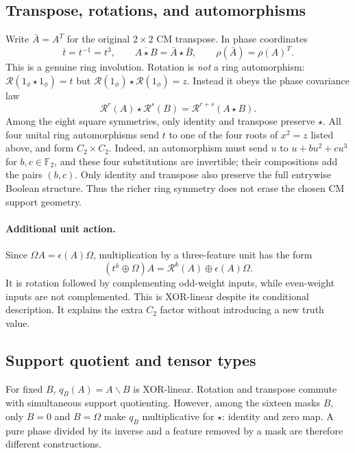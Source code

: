 \documentclass[11pt,a4paper]{article}
\theoremstyle{definition}\newtheorem{definition}[theorem]{Definition}
\theoremstyle{remark}\newtheorem{remark}[theorem]{Remark}
\newcommand{\F}{\mathbb F}
\newcommand{\rot}{\mathcal R}
\newcommand{\one}{1_{\phi}}
\numberwithin{equation}{section}
\begin{document}
\subsection{Transpose, rotations, and automorphisms}
Write $\bar A=A^T$ for the original $2\times2$ CM transpose. In phase coordinates
\begin{equation}
 \overline{t}=t^{-1}=t^3,\qquad
 \overline{A\star B}=\bar A\star\bar B,\qquad
 \rho(\bar A)=\rho(A)^T.
\end{equation}
This is a genuine ring involution. Rotation is \emph{not} a ring automorphism: $\rot(\one\star\one)=t$ but $\rot(\one)\star\rot(\one)=z$. Instead it obeys the phase covariance law
\begin{equation}
 \rot^r(A)\star\rot^s(B)=\rot^{r+s}(A\star B).
\end{equation}
Among the eight square symmetries, only identity and transpose preserve $\star$. All four unital ring automorphisms send $t$ to one of the four roots of $x^2=z$ listed above, and form $C_2\times C_2$. Indeed, an automorphism must send $u$ to $u+b u^2+c u^3$ for $b,c\in\F_2$, and these four substitutions are invertible; their compositions add the pairs $(b,c)$. Only identity and transpose also preserve the full entrywise Boolean structure. Thus the richer ring symmetry does not erase the chosen CM support geometry.

\paragraph{Additional unit action.}
Since $\Omega A=\epsilon(A)\Omega$, multiplication by a three-feature unit has the form
\begin{equation}\label{eq:unitaction}
 (t^k\oplus\Omega)A=\rot^k(A)\oplus\epsilon(A)\Omega.
\end{equation}
It is rotation followed by complementing odd-weight inputs, while even-weight inputs are not complemented. This is XOR-linear despite its conditional description. It explains the extra $C_2$ factor without introducing a new truth value.

\subsection{Support quotient and tensor types}
For fixed $B$, $q_B(A)=A\backslash B$ is XOR-linear. Rotation and transpose commute with simultaneous support quotienting. However, among the sixteen masks $B$, only $B=0$ and $B=\Omega$ make $q_B$ multiplicative for $\star$: identity and zero map. A pure phase divided by its inverse and a feature removed by a mask are therefore different constructions.
\end{document}
